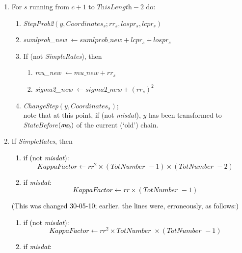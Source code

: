 \documentclass[a4paper,12pt,fleqn]{article}
\newcommand{\ms}{\textsl{\textsf{\small ms}}} %
\newcommand{\remark}[1]{{\textcolor[named]{Red}{#1}}}
\newcommand{\addcf}[1]{{\textcolor[named]{Black}{#1}}}
\begin{document}
\begin{enumerate}[resume]
\item  %
      For $s$ running from $c+1$ to $\textit{ThisLength} -2$ do:
      \begin{enumerate}
      \item \textit{StepProb2}$(y, \textit{Coordinates}_{s};
                                            rr_s, lospr_s, lcpr_s)$
      \item
        \textit{sumlprob\_new} $ \leftarrow \textit{sumlprob\_new} + lcpr_s + lospr_s $
      \item If (not \textit{SimpleRates}), then
         \begin{enumerate}
         \item  \textit{mu\_new} $ \leftarrow \textit{mu\_new} + rr_s  $
         \item   \textit{sigma2\_new} $ \leftarrow \textit{sigma2\_new}  + (rr_s)^2 $
         \end{enumerate}
      \item \textit{ChangeStep}$(y, \textit{Coordinates}_{s})$;\\
            note that at this point, if (not \textit{misdat}), $y$ has been transformed to
            \textit{StateBefore}$(\ms_b)$ of the current (`old') chain.
      \end{enumerate}
\item If \textit{SimpleRates}, then
\addcf{
      \begin{enumerate}
      \item if (not \textit{misdat}):
        \[
        \textit{KappaFactor} \leftarrow rr^2
                      \times ( \textit{TotNumber }-1) \times(\textit{TotNumber } -2)
        \]
      \item if \textit{misdat}:
        \[
        \textit{KappaFactor} \leftarrow rr \times ( \textit{TotNumber } -1)
        \]
      \end{enumerate}
(This was changed 30-05-10; earlier. the lines were, erroneously, as follows:)
      \begin{enumerate}
      \item if (not \textit{misdat}):
        \begin{equation}
        \textit{KappaFactor} \leftarrow rr^2
                      \times \textit{TotNumber } \times(\textit{TotNumber } -1) \nonumber
        \end{equation}
      \item if \textit{misdat}:
        \begin{equation}

\end{equation}
\end{enumerate}}
\end{enumerate}
\end{document}
